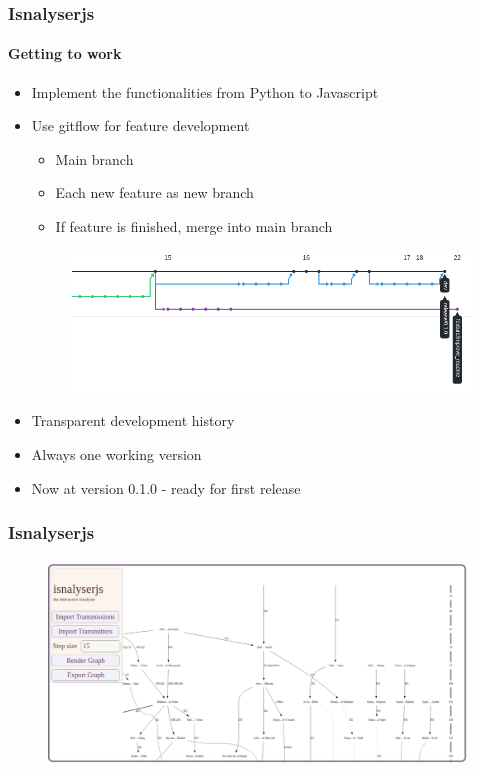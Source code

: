 \documentclass[9pt]{beamer}
\begin{document}
\begin{frame}
\frametitle{Isnalyserjs}
\framesubtitle{Getting to work}
\begin{itemize}%
	\item Implement the functionalities from Python to Javascript
	\item Use gitflow for feature development
	\begin{itemize}
		\item Main branch
		\item Each new feature as new branch
		\item If feature is finished, merge into main branch 
	\end{itemize}
	\begin{figure}
	\flushleft
	\includegraphics[width=.7\linewidth]{figures/git.png}
\end{figure}
	\item Transparent development history
	\item Always one working version
	\item Now at version 0.1.0 - ready for first release
	
\end{itemize}
\end{frame}



\begin{frame}
\frametitle{Isnalyserjs}
\framesubtitle{}
	\begin{figure}
	\flushleft
	\includegraphics[width=1.1\linewidth]{figures/isnalyser_screenshot.pdf}
\end{figure}
\end{frame}
\end{document}
